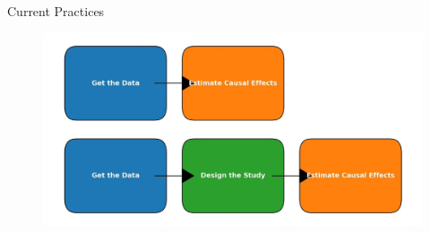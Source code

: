 \documentclass{beamer}
\begin{document}
\begin{frame}{Current Practices}
 
\begin{figure}
    \centering
    \includegraphics[width=\textwidth]{./lecture_includes/design_stage}
\end{figure}

\end{frame}
\end{document}
